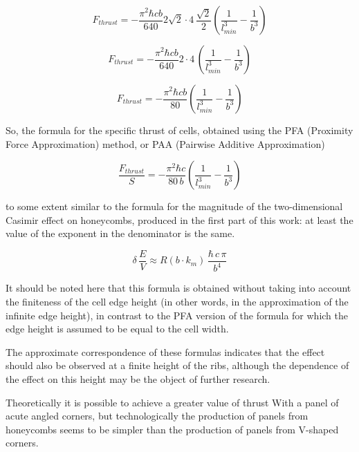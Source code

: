 \documentclass[11pt]{article}
\begin{document}
\[F_{thrust} = - \frac{\pi^2\hbar c b}{640} 2\sqrt{2}\cdot4\,\frac{\sqrt{2}}{2} \left(\frac{1}{l_{min}^3} - \frac{1}{b^3}\right)\]

\[F_{thrust} = - \frac{\pi^2\hbar c b}{640} 2\cdot4\,\left(\frac{1}{l_{min}^3} - \frac{1}{b^3}\right)\]

\[F_{thrust} = - \frac{\pi^2\hbar c b}{80} \left(\frac{1}{l_{min}^3} - \frac{1}{b^3}\right)\]

So, the formula for the specific thrust of cells, obtained using the PFA
(Proximity Force Approximation) method, or PAA (Pairwise Additive
Approximation)

\[\frac{F_{thrust}}{S} = - \frac{\pi^2\hbar c}{80\, b} \left(\frac{1}{l_{min}^3} - \frac{1}{b^3}\right)\]

to some extent similar to the formula for the magnitude of the
two-dimensional Casimir effect on honeycombs, produced in the first part
of this work: at least the value of the exponent in the denominator is
the same.

\[\delta\,\frac{E}{V} \approx R\left(b \cdot k_m\right)\,\frac{\hbar\,c\,\pi}{b^4}\]

It should be noted here that this formula is obtained without taking
into account the finiteness of the cell edge height (in other words, in
the approximation of the infinite edge height), in contrast to the PFA
version of the formula for which the edge height is assumed to be equal
to the cell width.

The approximate correspondence of these formulas indicates that the
effect should also be observed at a finite height of the ribs, although
the dependence of the effect on this height may be the object of further
research.

Theoretically it is possible to achieve a greater value of thrust With a
panel of acute angled corners, but technologically the production of
panels from honeycombs seems to be simpler than the production of panels
from V-shaped corners.
\end{document}
